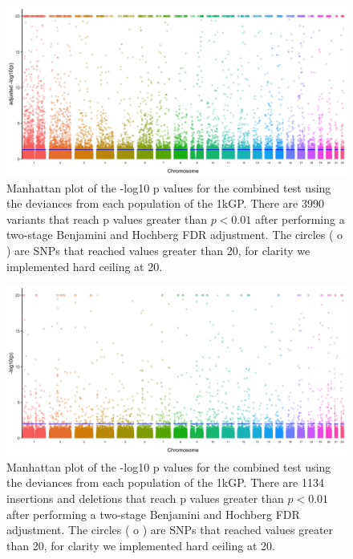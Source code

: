 \documentclass[9pt,lineno]{elife}
\begin{document}
\begin{figure}
\includegraphics[width=\hsize,keepaspectratio]{./Figures/ManhattanPlot_adjusted.jpg}

\caption{Manhattan plot of the -log10 p values for the combined test using the deviances from each population of the 1kGP. 
There are 3990 variants that reach p values greater than $ p < 0.01$ after performing a two-stage Benjamini and Hochberg FDR adjustment. 
The circles ( o ) are SNPs that reached values greater than 20, for clarity we implemented hard ceiling at 20.}
  \label{Manhattan}
\end{figure}

\begin{figure}
\includegraphics[width=\hsize,keepaspectratio]{./Figures/ManhattanPlot_indels.jpg}

\caption{Manhattan plot of the -log10 p values for the combined test using the deviances from each population of the 1kGP. 
There are 1134 insertions and deletions that reach p values greater than $ p < 0.01$ after performing a two-stage Benjamini and Hochberg FDR adjustment. 
The circles ( o ) are SNPs that reached values greater than 20, for clarity we implemented hard ceiling at 20.}
  \label{indels_Manhattan}
\end{figure}
\end{document}
